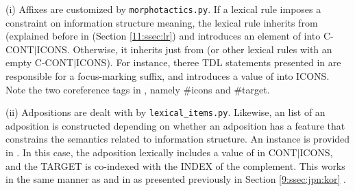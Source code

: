 (i) Affixes are customized by \texttt{morphotactics.py}.  If a lexical
rule imposes a constraint on information structure meaning, the
lexical rule inherits from  (explained before
in (Section \ref{11:ssec:lr}) and introduces an element of  into
C-CONT{$\mid$}ICONS. Otherwise, it inherits just
from  (or other lexical rules with an
empty C-CONT{$\mid$}ICONS). For instance, theree TDL statements
presented in  are responsible for a focus-marking
suffix, and introduces a value of  into ICONS. Note the
two coreference tags in , namely \#icons and
\#target.




(ii) Adpositions are dealt with by
\texttt{lexical\_items.py}. Likewise, an  list of an adposition
is constructed depending on whether an adposition has a feature that
constrains the semantics related to information structure. An instance
is provided in . In this case, the adposition lexically
includes a value of  in CONT{$\mid$}ICONS, and the
TARGET is co-indexed with the INDEX of the complement. This works in
the same manner as \ga and \wa in  as presented
previously in Section \ref{9:ssec:jpn:kor} .





